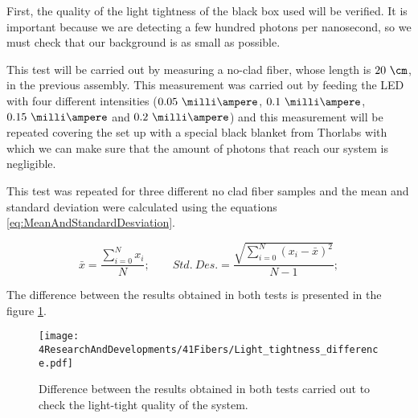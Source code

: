 First, the quality of the light tightness of the black box used will be verified. It is important because we are detecting a few hundred photons per nanosecond, so we must check that our background is as small as possible.

This test will be carried out by measuring a no-clad fiber, whose length is $20~\cm$, in the previous assembly. This measurement was carried out by feeding the LED with four different intensities ($0.05~\milli\ampere$, $0.1~\milli\ampere$, $0.15~\milli\ampere$ and $0.2~\milli\ampere$) and this measurement will be repeated covering the set up with a special black blanket from Thorlabs \cite{BlackBlancket} with which we can make sure that the amount of photons that reach our system is negligible. 

This test was repeated for three different no clad fiber samples and the mean and standard deviation were calculated using the equations \ref{eq:MeanAndStandardDesviation}.

\begin{equation}
\bar{x}=\frac{\sum_{i=0}^{N}x_i}{N}; \qquad Std.~Des. = \frac{\sqrt{\sum_{i=0}^{N}(x_i-\bar{x})^2}}{N-1};
\label{eq:MeanAndStandardDesviation}
\end{equation}

The difference between the results obtained in both tests is presented in the figure \ref{fig:LightTightnessTest}.


\begin{figure}[h]
\centering
\texttt{[image: 4ResearchAndDevelopments/41Fibers/Light\_tightness\_difference.pdf]}
\caption{Difference between the results obtained in both tests carried out to check the light-tight quality of the system.\label{fig:LightTightnessTest}}
\end{figure}

